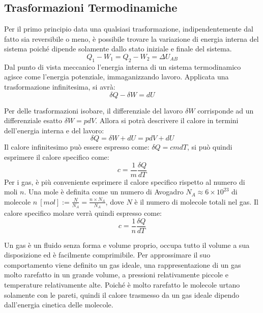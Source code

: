 \documentclass{article}
\numberwithin{equation}{subsection}
\begin{document}
\subsection{Trasformazioni Termodinamiche}
Per il primo principio data una qualsiasi trasformazione, 
indipendentemente dal fatto sia reversibile o meno, è 
possibile trovare la variazione di energia interna del 
sistema
poiché dipende solamente dallo stato iniziale e finale del sistema. 
\begin{equation*}
    Q_1-W_1=Q_2-W_2=\Delta U_{AB}
\end{equation*}
Dal punto di vista meccanico l'energia interna di un 
sistema termodinamico agisce 
come l'energia potenziale, immaganizzando lavoro. 
Applicata una trasformazione infinitesima, si avrà:
\begin{equation*}
    \delta Q-\delta W=dU
\end{equation*}

Per delle trasformazioni isobare, il differenziale del lavoro $\delta W$ corrisponde ad un differenziale esatto $\delta W=pdV$. 
Allora si potrà descrivere il calore in termini dell'energia 
interna e del lavoro:
\begin{equation*}
    \delta Q=\delta W+dU=pdV+dU
\end{equation*}
Il calore infinitesimo può essere espresso come: $\delta Q=cmdT$, 
si può quindi esprimere il calore specifico come:
\begin{equation*}
    c=\displaystyle\frac{1}{m}\frac{\delta Q}{dT}
\end{equation*}
Per i gas, è più conveniente esprimere il calore specifico 
rispetto al numero di moli $n$. Una mole è definita come un numero 
di Avogadro $N_A\approx 6\times10^{23}$ di molecole $n\:[mol]:=\displaystyle\frac{N}{N_A}=\frac{n\times N_A}{N_A}$, 
dove $N$ è il numero di molecole totali nel gas. Il calore specifico molare verrà quindi espresso come: 
\begin{equation*}
    c=\displaystyle\frac{1}{n}\frac{\delta Q}{dT}
\end{equation*}



Un gas è un fluido senza forma e volume proprio, occupa tutto il volume a sua disposizione ed è facilmente comprimibile. 
Per approssimare il suo comportamento viene definito 
un gas ideale, una rappresentazione di un gas molto 
rarefatto in un grande volume, a pressioni relativamente piccole 
e temperature relativamente alte. Poiché è molto rarefatto le 
molecole urtano solamente con le pareti, quindi il calore 
trasmesso da un gas ideale dipendo dall'energia cinetica delle 
molecole. 
\end{document}
